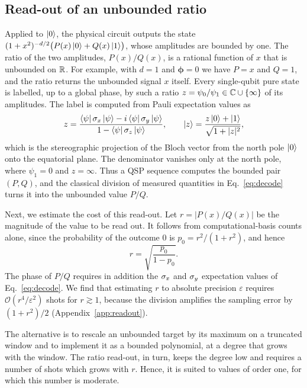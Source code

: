 \subsection{Read-out of an unbounded ratio}
\label{subsec:encoding}

Applied to $\ket{0}$, the physical circuit outputs the state
$(1+x^2)^{-d/2}\bigl(P(x)\ket{0}+Q(x)\ket{1}\bigr)$, whose
amplitudes are bounded by one.  The ratio of the two amplitudes,
$P(x)/Q(x)$, is a rational function of $x$ that is unbounded on
$\mathbb{R}$.  For example, with $d=1$ and $\bm\phi=0$ we have $P=x$ and
$Q=1$, and the ratio returns the unbounded signal $x$ itself.
Every single-qubit pure state is labelled, up to a global phase,
by such a ratio $z=\psi_0/\psi_1\in\mathbb{C}\cup\{\infty\}$ of its
amplitudes.  The label is computed from Pauli expectation values
as
\begin{equation}
	z=\frac{\bra{\psi}\sigma_x\ket{\psi}-i\bra{\psi}\sigma_y\ket{\psi}}
	{1-\bra{\psi}\sigma_z\ket{\psi}},
	\qquad
	\ket{z}=\frac{z\ket{0}+\ket{1}}{\sqrt{1+|z|^2}},
	\label{eq:decode}
\end{equation}
which is the stereographic projection of the Bloch vector from the
north pole $\ket{0}$ onto the equatorial plane.  The denominator
vanishes only at the north pole, where $\psi_1=0$ and $z=\infty$.
Thus a QSP sequence computes the bounded pair $(P,Q)$, and the
classical division of measured quantities in Eq.~\eqref{eq:decode}
turns it into the unbounded value $P/Q$.

Next, we estimate the cost of this read-out.  Let $r=|P(x)/Q(x)|$ be
the magnitude of the value to be read out.  It follows from
computational-basis counts alone, since the probability of the
outcome $0$ is $p_0=r^2/(1+r^2)$, and hence
\begin{equation}
	r=\sqrt{\frac{p_0}{1-p_0}}.
	\label{eq:r-estimator}
\end{equation}
The phase of $P/Q$ requires in addition the $\sigma_x$ and
$\sigma_y$ expectation values of Eq.~\eqref{eq:decode}.  We find
that estimating $r$ to absolute precision $\varepsilon$ requires
$\mathcal{O}(r^4/\varepsilon^2)$ shots for $r\gtrsim 1$, because
the division amplifies the sampling error by $(1+r^2)/2$
(Appendix~\ref{app:readout}).

The alternative is to rescale an unbounded target by its maximum
on a truncated window and to implement it as a bounded polynomial,
at a degree that grows with the window.  The ratio read-out, in
turn, keeps the degree low and requires a number of shots which
grows with $r$.  Hence, it is suited to values of order one, for
which this number is moderate.

